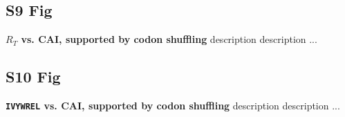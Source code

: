\documentclass[10pt,letterpaper]{article}
\begin{document}
\subsection*{S9 Fig}
\label{fig:s9}
{\bf $R_T$ vs. CAI, supported by codon shuffling}
description description ...

\subsection*{S10 Fig}
\label{fig:s10}
{\bf \texttt{IVYWREL} vs. CAI, supported by codon shuffling}
description description ...






\end{document}
